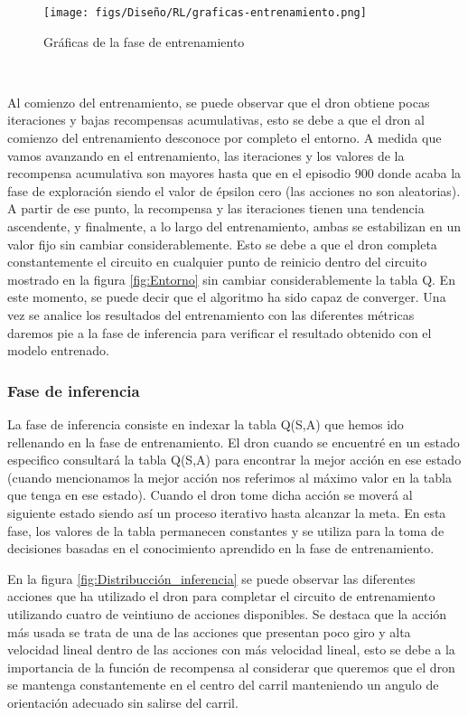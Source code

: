 \begin{figure} [H]
  \begin{center}
    \texttt{[image: figs/Diseño/RL/graficas-entrenamiento.png]}
  \end{center}
  \caption{Gráficas de la fase de entrenamiento}
  \label{fig:entrenamiento}
\end{figure}\

Al comienzo del entrenamiento, se puede observar que el dron obtiene pocas iteraciones y bajas recompensas acumulativas, 
esto se debe a que el dron al comienzo del entrenamiento desconoce por completo el entorno. A medida que vamos avanzando en el entrenamiento, 
las iteraciones y los valores de la recompensa acumulativa son mayores hasta que en el episodio 900 donde acaba la fase de exploración 
siendo el valor de épsilon cero (las acciones no son aleatorias). A partir de ese punto, la recompensa y las iteraciones tienen una tendencia ascendente, y finalmente, 
a lo largo del entrenamiento, ambas se estabilizan en un valor fijo sin cambiar considerablemente. Esto se debe a que el dron completa constantemente el circuito en cualquier
punto de reinicio dentro del circuito mostrado en la figura \ref{fig:Entorno} sin cambiar considerablemente la tabla Q. En este momento, se puede decir que el algoritmo ha sido capaz de converger. Una vez se analice 
los resultados del entrenamiento con las diferentes métricas daremos pie a la fase de inferencia para verificar el resultado obtenido con el modelo entrenado. 

\subsubsection{Fase de inferencia}
\label{sec:fases_inferencia}
La fase de inferencia consiste en indexar la tabla Q(S,A) que hemos ido rellenando en la fase de entrenamiento. El dron cuando se encuentré en un estado especifico consultará la tabla Q(S,A) para
encontrar la mejor acción en ese estado (cuando mencionamos la mejor acción nos referimos al máximo valor en la tabla que tenga en ese estado). Cuando el dron tome dicha acción se moverá al siguiente estado
siendo así un proceso iterativo hasta alcanzar la meta. En esta fase, los valores de la tabla permanecen constantes y se utiliza para la toma de decisiones basadas en el conocimiento
aprendido en la fase de entrenamiento. \newline

En la figura \ref{fig:Distribucción_inferencia} se puede observar las diferentes acciones que ha utilizado el dron para completar el circuito de entrenamiento utilizando cuatro de veintiuno de acciones
disponibles. Se destaca que la acción más usada se trata de una de las acciones que presentan poco giro y alta velocidad lineal dentro de las acciones con más velocidad lineal, esto se debe
a la importancia de la función de recompensa al considerar que queremos que el dron se mantenga constantemente en el centro del carril manteniendo un angulo de orientación adecuado
sin salirse del carril.

